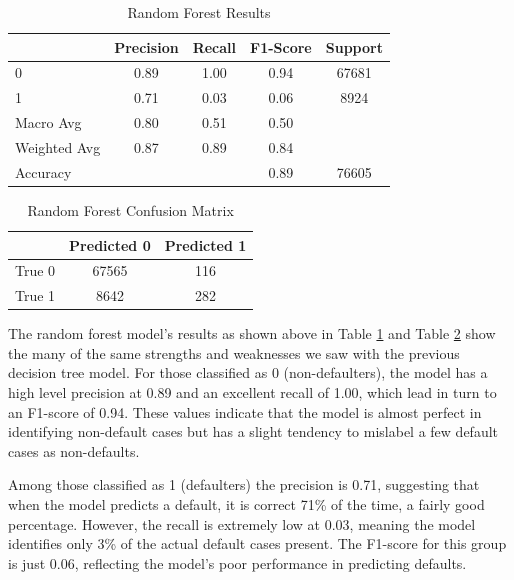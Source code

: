 \documentclass[12pt]{article}
\begin{document}
\begin{table}[htbp]
    \centering
    \caption{Random Forest Results}
    \begin{tabular}{lcccc}
        \toprule
        & Precision & Recall & F1-Score & Support \\
        \midrule
        0 & 0.89 & 1.00 & 0.94 & 67681 \\
        1 & 0.71 & 0.03 & 0.06 & 8924 \\
        Macro Avg & 0.80 & 0.51 & 0.50 & \\
        Weighted Avg & 0.87 & 0.89 & 0.84 & \\
        \midrule
        Accuracy & & & 0.89 & 76605 \\
        \bottomrule
    \end{tabular}
    \label{table:randomForestResults}
\end{table}

\begin{table}[htbp]
    \centering
    \caption{Random Forest Confusion Matrix}
    \begin{tabular}{lcc}
        \toprule
        & Predicted 0 & Predicted 1 \\
        \midrule
        True 0 & 67565 & 116 \\
        True 1 & 8642 & 282 \\
        \bottomrule
    \end{tabular}
    \label{table:randomForestConfusionMatrix}
\end{table}

The random forest model's results as shown above in Table \ref{table:randomForestResults} and Table \ref{table:randomForestConfusionMatrix} show the many of the same strengths and weaknesses we saw with the previous decision tree model. For those classified as 0 (non-defaulters), the model has a high level precision at 0.89 and an excellent recall of 1.00, which lead in turn to an F1-score of 0.94. These values indicate that the model is almost perfect in identifying non-default cases but has a slight tendency to mislabel a few default cases as non-defaults.

Among those classified as 1 (defaulters) the precision is 0.71, suggesting that when the model predicts a default, it is correct 71\% of the time, a fairly good percentage. However, the recall is extremely low at 0.03, meaning the model identifies only 3\% of the actual default cases present. The F1-score for this group is just 0.06, reflecting the model's poor performance in predicting defaults.
\end{document}
